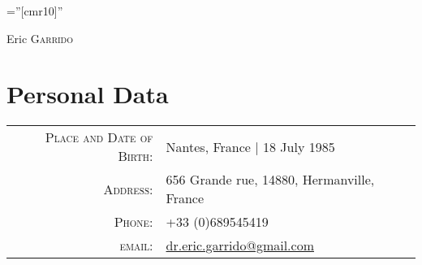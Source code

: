 \documentclass[a4paper,10pt]{article}
\begin{document}

\pagestyle{empty} %

\font\fb=''[cmr10]'' %

\par{\centering
		{\huge Eric \textsc{Garrido}
	}\bigskip\par}

\section{Personal Data}

\begin{tabular}{rl}
    \textsc{Place and Date of Birth:} & Nantes, France  | 18 July 1985 \\
    \textsc{Address:}   & 656 Grande rue, 14880, Hermanville, France \\
    \textsc{Phone:}     & +33 (0)689545419\\
    \textsc{email:}     & \href{mailto:dr.eric.garrido@gmail.com}{dr.eric.garrido@gmail.com}
\end{tabular}

\end{document}
